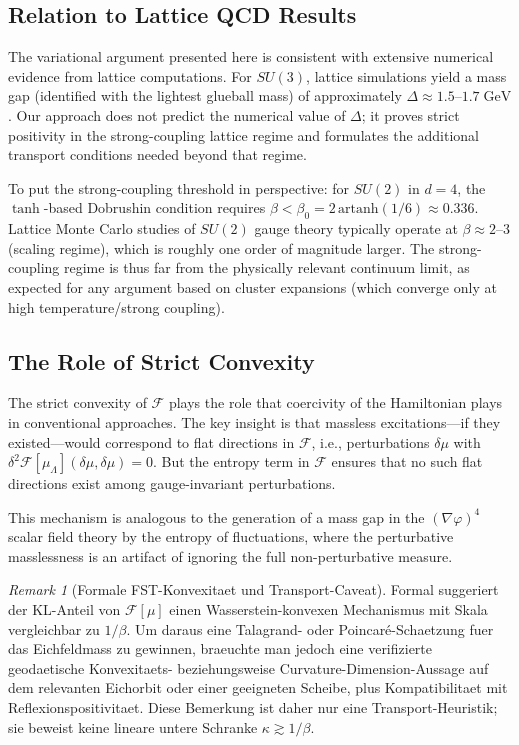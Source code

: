 \documentclass[12pt,a4paper]{article}
\theoremstyle{definition}
\theoremstyle{plain}
\theoremstyle{remark}
\newtheorem{remark}[definition]{Remark}
\begin{document}
\subsection{Relation to Lattice QCD Results}

The variational argument presented here is consistent with extensive numerical evidence from lattice computations. For $SU(3)$, lattice simulations yield a mass gap (identified with the lightest glueball mass) of approximately $\Delta \approx 1.5$--$1.7\;\mathrm{GeV}$ \cite{MorningstarPeardon1999, ChenXu2006}. Our approach does not predict the numerical value of $\Delta$; it proves strict positivity in the strong-coupling lattice regime and formulates the additional transport conditions needed beyond that regime.

To put the strong-coupling threshold in perspective: for $SU(2)$ in $d=4$, the $\tanh$-based Dobrushin condition requires $\beta < \beta_0 = 2\,\mathrm{artanh}(1/6) \approx 0.336$. Lattice Monte Carlo studies of $SU(2)$ gauge theory typically operate at $\beta \approx 2$--$3$ (scaling regime), which is roughly one order of magnitude larger. The strong-coupling regime is thus far from the physically relevant continuum limit, as expected for any argument based on cluster expansions (which converge only at high temperature/strong coupling).

\subsection{The Role of Strict Convexity}

The strict convexity of $\mathcal{F}$ plays the role that coercivity of the Hamiltonian plays in conventional approaches. The key insight is that massless excitations---if they existed---would correspond to flat directions in $\mathcal{F}$, i.e., perturbations $\delta\mu$ with $\delta^2 \mathcal{F}[\mu_\Lambda](\delta\mu, \delta\mu) = 0$. But the entropy term in $\mathcal{F}$ ensures that no such flat directions exist among gauge-invariant perturbations.

This mechanism is analogous to the generation of a mass gap in the $(\nabla\varphi)^4$ scalar field theory by the entropy of fluctuations, where the perturbative masslessness is an artifact of ignoring the full non-perturbative measure.

\begin{remark}[Formale FST-Konvexitaet und Transport-Caveat]
\label{rem:fst-convexity-talagrand}
Formal suggeriert der KL-Anteil von $\mathcal{F}[\mu]$ einen Wasserstein-konvexen Mechanismus mit Skala vergleichbar zu $1/\beta$. Um daraus eine Talagrand- oder Poincar\'e-Schaetzung fuer das Eichfeldmass zu gewinnen, braeuchte man jedoch eine verifizierte geodaetische Konvexitaets- beziehungsweise Curvature-Dimension-Aussage auf dem relevanten Eichorbit oder einer geeigneten Scheibe, plus Kompatibilitaet mit Reflexionspositivitaet. Diese Bemerkung ist daher nur eine Transport-Heuristik; sie beweist keine lineare untere Schranke $\kappa \gtrsim 1/\beta$.
\end{remark}
\end{document}

